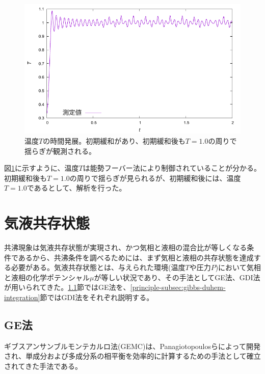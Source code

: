 \documentclass[titlepage]{jsreport}
\begin{document}
\begin{figure}[htbp]
    \begin{center}
        \includegraphics[width=14cm]{fig/nose-hoover/tT.pdf}
    \end{center}
    \caption{温度$T$の時間発展。初期緩和があり、初期緩和後も$T=1.0$の周りで揺らぎが観測される。}
    \label{fig:time-temperature}
\end{figure}

\newpage
図\ref{fig:time-temperature}に示すように、温度$T$は能勢フーバー法により制御されていることが分かる。
初期緩和後も$T=1.0$の周りで揺らぎが見られるが、初期緩和後には、温度$T=1.0$であるとして、解析を行った。


\section{気液共存状態} \label{principle-sec:gas-liquid-coexistence}
共沸現象は気液共存状態が実現され、かつ気相と液相の混合比が等しくなる条件であるから、共沸条件を調べるためには、まず気相と液相の共存状態を達成する必要がある。気液共存状態とは、与えられた環境(温度$T$や圧力$P$)において気相と液相の化学ポテンシャル$\mu$が等しい状況であり、その手法としてGE法、GDI法が用いられてきた。\ref{principle-subsec:gibbs-ensemble}節ではGE法を、\ref{principle-subsec:gibbs-duhem-integration}節ではGDI法をそれぞれ説明する。

\subsection{GE法} \label{principle-subsec:gibbs-ensemble}
ギブスアンサンブルモンテカルロ法(GEMC)は、Panagiotopoulosらによって開発され\cite{gibbs-ensemble-panagiotopoulos-1,gibbs-ensemble-panagiotopoulos-2}、単成分および多成分系の相平衡を効率的に計算するための手法として確立されてきた手法である\cite{gibbs-ensemble-phase-equilibrium-1,gibbs-ensemble-phase-equilibrium-2}。
\end{document}
